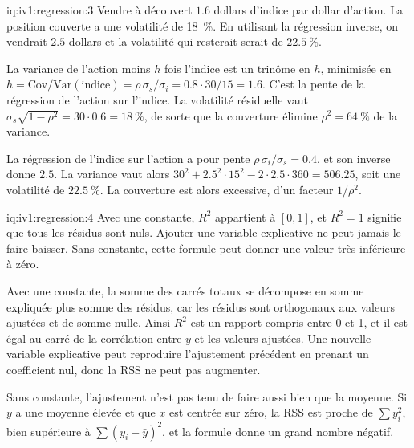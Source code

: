 \begin{solution}{iq:iv1:regression:3}
Vendre à découvert $1.6$ dollars d'indice par dollar d'action. La position couverte a une volatilité de 18~\%. En utilisant la régression inverse, on vendrait $2.5$ dollars et la volatilité qui resterait serait de $22.5~\%$.

\begin{sloppypar}La variance de l'action moins $h$ fois l'indice est un trinôme en $h$, minimisée en $h = \mathrm{Cov}/\mathrm{Var}(\text{indice}) = \rho\,\sigma_s/\sigma_i = 0.8 \cdot 30/15 = 1.6$. C'est la pente de la régression de l'action sur l'indice. La volatilité résiduelle vaut $\sigma_s\sqrt{1 - \rho^2} = 30 \cdot 0.6 = 18~\%$, de sorte que la couverture élimine $\rho^2 = 64~\%$ de la variance.\end{sloppypar}

La régression de l'indice sur l'action a pour pente $\rho\,\sigma_i/\sigma_s = 0.4$, et son inverse donne $2.5$. La variance vaut alors $30^2 + 2.5^2 \cdot 15^2 - 2 \cdot 2.5 \cdot 360 = 506.25$, soit une volatilité de $22.5~\%$. La couverture est alors excessive, d'un facteur $1/\rho^2$.

\end{solution}

\begin{solution}{iq:iv1:regression:4}
Avec une constante, $R^2$ appartient à $[0, 1]$, et $R^2 = 1$ signifie que tous les résidus sont nuls. Ajouter une variable explicative ne peut jamais le faire baisser. Sans constante, cette formule peut donner une valeur très inférieure à zéro.

Avec une constante, la somme des carrés totaux se décompose en somme expliquée plus somme des résidus, car les résidus sont orthogonaux aux valeurs ajustées et de somme nulle. Ainsi $R^2$ est un rapport compris entre 0 et 1, et il est égal au carré de la corrélation entre $y$ et les valeurs ajustées. Une nouvelle variable explicative peut reproduire l'ajustement précédent en prenant un coefficient nul, donc la RSS ne peut pas augmenter.

Sans constante, l'ajustement n'est pas tenu de faire aussi bien que la moyenne. Si $y$ a une moyenne élevée et que $x$ est centrée sur zéro, la RSS est proche de $\sum y_i^2$, bien supérieure à $\sum(y_i - \bar y)^2$, et la formule donne un grand nombre négatif.

\end{solution}

